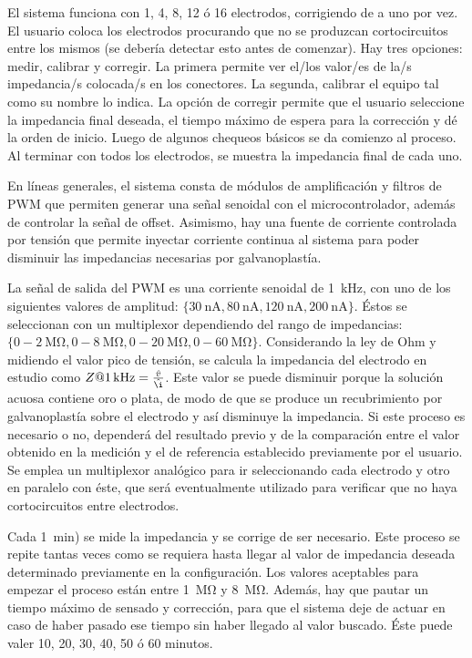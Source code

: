 El sistema funciona con 1, 4, 8, 12 ó 16 electrodos, corrigiendo de a uno por vez. El usuario coloca los electrodos procurando que no se produzcan cortocircuitos entre los mismos (se debería detectar esto antes de comenzar). Hay tres opciones: medir, calibrar y corregir. La primera permite ver el/los valor/es de la/s impedancia/s colocada/s en los conectores. La segunda, calibrar el equipo tal como su nombre lo indica. La opción de corregir permite que el usuario seleccione la impedancia final deseada, el tiempo máximo de espera para la corrección y dé la orden de inicio. Luego de algunos chequeos básicos se da comienzo al proceso. Al terminar con todos los electrodos, se muestra la impedancia final de cada uno. 

En líneas generales, el sistema consta de módulos de amplificación y filtros de PWM que permiten generar una señal senoidal con el microcontrolador, además de controlar la señal de offset. Asimismo, hay una fuente de corriente controlada por tensión que permite inyectar corriente continua al sistema para poder disminuir las impedancias necesarias por galvanoplastía. 

La señal de salida del PWM es una corriente senoidal de \SI{1}{\kilo\hertz}, con uno de los siguientes valores de amplitud: $\{\SI{30}{\nano\ampere}, \SI{80}{\nano\ampere}, \SI{120}{\nano\ampere}, \SI{200}{\nano\ampere}\}$. Éstos se seleccionan con un multiplexor dependiendo del rango de impedancias: $\{0-\SI{2}{\mega\ohm}, 0-\SI{8}{\mega\ohm}, 0-\SI{20}{\mega\ohm}, 0-\SI{60}{\mega\ohm}\}$. Considerando la ley de Ohm y midiendo el valor pico de tensión, se calcula la impedancia del electrodo en estudio como $Z@\SI{1}{\kilo\hertz} = \frac{\hat{v}}{\hat{\i}}$. Este valor se puede disminuir porque la solución acuosa contiene oro o plata, de modo de que se produce un recubrimiento por galvanoplastía sobre el electrodo y así disminuye la impedancia. Si este proceso es necesario o no, dependerá del resultado previo y de la comparación entre el valor obtenido en la medición y el de referencia establecido previamente por el usuario. Se emplea un multiplexor analógico para ir seleccionando cada electrodo y otro en paralelo con éste, que será eventualmente utilizado para verificar que no haya cortocircuitos entre electrodos. 

Cada \SI{1}{\minute}) se mide la impedancia y se corrige de ser necesario. Este proceso se repite tantas veces como se requiera hasta llegar al valor de impedancia deseada determinado previamente en la configuración. Los valores aceptables para empezar el proceso están entre \SI{1}{\mega\ohm} y \SI{8}{\mega\ohm}. Además, hay que pautar un tiempo máximo de sensado y corrección, para que el sistema deje de actuar en caso de haber pasado ese tiempo sin haber llegado al valor buscado. Éste puede valer 10, 20, 30, 40, 50 ó 60 minutos.

